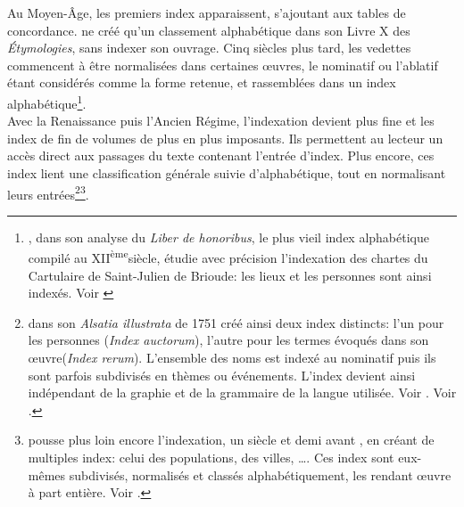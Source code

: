 Au Moyen-Âge, les premiers index apparaissent, s'ajoutant aux tables de concordance.  ne créé qu'un classement alphabétique dans son Livre X des \textit{Étymologies}, sans indexer son ouvrage. Cinq siècles plus tard, les vedettes commencent à être normalisées dans certaines œuvres, le nominatif ou l'ablatif étant considérés comme la forme retenue, et rassemblées dans un index alphabétique\footnote{, dans son analyse du \textit{Liber de honoribus}, le plus vieil index alphabétique compilé au \textsc{XII}\textsuperscript{ème}siècle, étudie avec précision l'indexation des chartes du Cartulaire de Saint-Julien de Brioude: les lieux et les personnes sont ainsi indexés. Voir \cite[pp.97 et suivantes]{berger_indexation_2006}}.\\

Avec la Renaissance puis l'Ancien Régime, l'indexation devient plus fine et les index de fin de volumes de plus en plus imposants. Ils permettent au lecteur un accès direct aux passages du texte contenant l'entrée d'index. Plus encore, ces index lient une classification générale suivie d'alphabétique, tout en normalisant leurs entrées\footnote{ dans son \textit{Alsatia illustrata} de 1751 créé ainsi deux index distincts: l'un pour les personnes (\textit{Index auctorum}), l'autre pour les termes évoqués dans son œuvre(\textit{Index rerum}). L'ensemble des noms est indexé au nominatif puis ils sont parfois subdivisés en thèmes ou événements. L'index devient ainsi indépendant de la graphie et de la grammaire de la langue utilisée. Voir \cite{schoepflin_alsatia_1751}. Voir .}\footnote{ pousse plus loin encore l'indexation, un siècle et demi avant , en créant de multiples index: celui des populations, des villes, \dots. Ces index sont eux-mêmes subdivisés, normalisés et classés alphabétiquement, les rendant œuvre à part entière. Voir \cite{estienne_thesaurus_1573}.}.